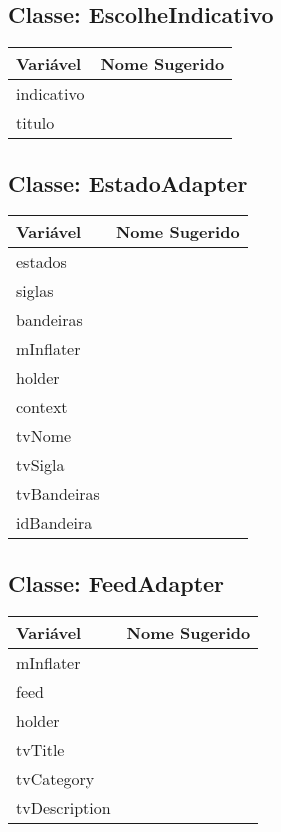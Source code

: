 \documentclass[12pt]{article}
\begin{document}
	\subsection{Classe: EscolheIndicativo}
		\begin{table}[H]
			\begin{center}
				\begin{tabular}{l | l}
					\toprule
						Variável & Nome Sugerido\\
					\midrule
						indicativo & \\
						titulo & \\
					\bottomrule
				\end{tabular}
			\end{center}
		\end{table}

	\subsection{Classe: EstadoAdapter}
		\begin{table}[H]
			\begin{center}
				\begin{tabular}{l | l}
					\toprule
						Variável & Nome Sugerido\\
					\midrule
						estados & \\
						siglas & \\
						bandeiras & \\
						mInflater & \\
						holder & \\
						context & \\
						tvNome & \\
						tvSigla & \\
						tvBandeiras & \\
						idBandeira & \\
					\bottomrule
				\end{tabular}
			\end{center}
		\end{table}

	\subsection{Classe: FeedAdapter}
		\begin{table}[H]
			\begin{center}
				\begin{tabular}{l | l}
					\toprule
						Variável & Nome Sugerido\\
					\midrule
						mInflater & \\
						feed & \\
						holder & \\
						tvTitle & \\
						tvCategory & \\
						tvDescription & \\
					\bottomrule
				\end{tabular}
			\end{center}
		\end{table}
\end{document}
